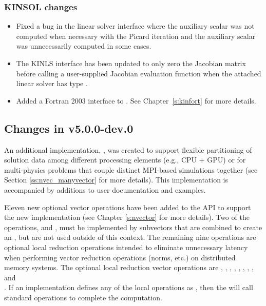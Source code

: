 \subsubsection*{KINSOL changes}

\begin{itemize}
\item Fixed a bug in the {\kinsol} linear solver interface where the auxiliary scalar
 was not computed when necessary with the Picard iteration and the
auxiliary scalar  was unnecessarily computed in some cases.
%
\item The KINLS interface has been updated to only zero the Jacobian matrix before
calling a user-supplied Jacobian evaluation function when the attached linear
solver has type \newline\noindent
{}.
%
\item Added a Fortran 2003 interface to {\kinsol}. See Chapter~\ref{s:kinfort}
for more details.
\end{itemize}


\subsection*{Changes in v5.0.0-dev.0}

An additional {\nvector} implementation, {\nvecmanyvector}, was
created to support flexible partitioning of solution data among
different processing elements (e.g., CPU + GPU) or for multi-physics
problems that couple distinct MPI-based simulations together (see
Section \ref{ss:nvec_manyvector} for more details).  This
implementation is accompanied by additions to user documentation and
{\sundials} examples.

Eleven new optional vector operations have been added to the {\nvector} API to
support the new {\nvecmanyvector} implementation (see Chapter \ref{s:nvector}
for more details). Two of the operations,  and
, must be implemented by subvectors that are combined to
create an {\nvecmanyvector}, but are not used outside of this context. The
remaining nine operations are optional local reduction operations intended to
eliminate unnecessary latency when performing vector reduction operations
(norms, etc.) on distributed memory systems. The optional local reduction vector
operations are
,
,
,
,
,
,
,
, and\\
.
If an {\nvector} implementation defines any of the local operations as
, then the {\nvecmanyvector} will call standard {\nvector} operations
to complete the computation.

